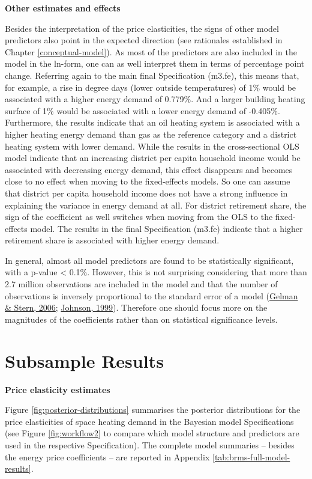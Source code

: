 \documentclass[12pt,twoside]{reedthesis}
\begin{document}
\textbf{Other estimates and effects}

Besides the interpretation of the price elasticities, the signs of other model predictors also point in the expected direction (see rationales established in Chapter \ref{conceptual-model}). As most of the predictors are also included in the model in the ln-form, one can as well interpret them in terms of percentage point change. Referring again to the main final Specification (m3.fe), this means that, for example, a rise in degree days (lower outside temperatures) of 1\% would be associated with a higher energy demand of 0.779\%. And a larger building heating surface of 1\% would be associated with a lower energy demand of -0.405\%. Furthermore, the results indicate that an oil heating system is associated with a higher heating energy demand than gas as the reference category and a district heating system with lower demand. While the results in the cross-sectional OLS model indicate that an increasing district per capita household income would be associated with decreasing energy demand, this effect disappears and becomes close to no effect when moving to the fixed-effects models. So one can assume that district per capita household income does not have a strong influence in explaining the variance in energy demand at all. For district retirement share, the sign of the coefficient as well switches when moving from the OLS to the fixed-effects model. The results in the final Specification (m3.fe) indicate that a higher retirement share is associated with higher energy demand.

In general, almost all model predictors are found to be statistically significant, with a p-value \textless{} 0.1\%. However, this is not surprising considering that more than 2.7 million observations are included in the model and that the number of observations is inversely proportional to the standard error of a model (\protect\hyperlink{ref-gelman_stern06}{Gelman \& Stern, 2006}; \protect\hyperlink{ref-johnson99}{Johnson, 1999}). Therefore one should focus more on the magnitudes of the coefficients rather than on statistical significance levels.

\hypertarget{subsample-results}{%
\section{Subsample Results}\label{subsample-results}}

\textbf{Price elasticity estimates}

Figure \ref{fig:posterior-distributions} summarises the posterior distributions for the price elasticities of space heating demand in the Bayesian model Specifications (see Figure \ref{fig:workflow2} to compare which model structure and predictors are used in the respective Specification). The complete model summaries -- besides the energy price coefficients -- are reported in Appendix \ref{tab:brms-full-model-results}.
\end{document}
